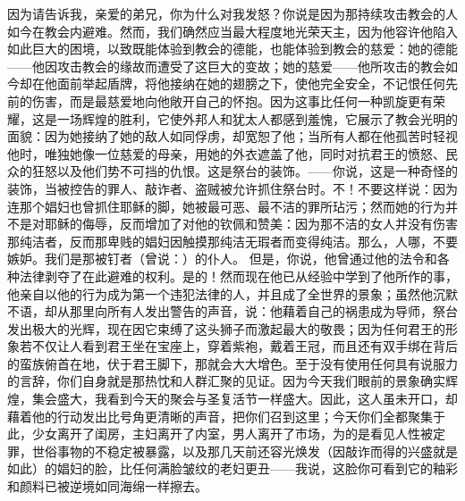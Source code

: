 因为请告诉我，亲爱的弟兄，你为什么对我发怒？你说是因为那持续攻击教会的人如今在教会内避难。然而，我们确然应当最大程度地光荣天主，因为他容许他陷入如此巨大的困境，以致既能体验到教会的德能，也能体验到教会的慈爱：她的德能——他因攻击教会的缘故而遭受了这巨大的变故；她的慈爱——他所攻击的教会如今却在他面前举起盾牌，将他接纳在她的翅膀之下，使他完全安全，不记恨任何先前的伤害，而是最慈爱地向他敞开自己的怀抱。因为这事比任何一种凯旋更有荣耀，这是一场辉煌的胜利，它使外邦人和犹太人都感到羞愧，它展示了教会光明的面貌：因为她接纳了她的敌人如同俘虏，却宽恕了他；当所有人都在他孤苦时轻视他时，唯独她像一位慈爱的母亲，用她的外衣遮盖了他，同时对抗君王的愤怒、民众的狂怒以及他们势不可挡的仇恨。这是祭台的装饰。——你说，这是一种奇怪的装饰，当被控告的罪人、敲诈者、盗贼被允许抓住祭台时。不！不要这样说：因为连那个娼妇也曾抓住耶稣的脚，她被最可恶、最不洁的罪所玷污；然而她的行为并不是对耶稣的侮辱，反而增加了对他的钦佩和赞美：因为那不洁的女人并没有伤害那纯洁者，反而那卑贱的娼妇因触摸那纯洁无瑕者而变得纯洁。那么，人哪，不要嫉妒。我们是那被钉者（曾说：）的仆人。  但是，你说，他曾通过他的法令和各种法律剥夺了在此避难的权利。是的！然而现在他已从经验中学到了他所作的事，他亲自以他的行为成为第一个违犯法律的人，并且成了全世界的景象；虽然他沉默不语，却从那里向所有人发出警告的声音，说：他藉着自己的祸患成为导师，祭台发出极大的光辉，现在因它束缚了这头狮子而激起最大的敬畏；因为任何君王的形象若不仅让人看到君王坐在宝座上，穿着紫袍，戴着王冠，而且还有双手绑在背后的蛮族俯首在地，伏于君王脚下，那就会大大增色。至于没有使用任何具有说服力的言辞，你们自身就是那热忱和人群汇聚的见证。因为今天我们眼前的景象确实辉煌，集会盛大，我看到今天的聚会与圣复活节一样盛大。因此，这人虽未开口，却藉着他的行动发出比号角更清晰的声音，把你们召到这里；今天你们全都聚集于此，少女离开了闺房，主妇离开了内室，男人离开了市场，为的是看见人性被定罪，世俗事物的不稳定被暴露，以及那几天前还容光焕发（因敲诈而得的兴盛就是如此）的娼妇的脸，比任何满脸皱纹的老妇更丑——我说，这脸你可看到它的釉彩和颜料已被逆境如同海绵一样擦去。\par

